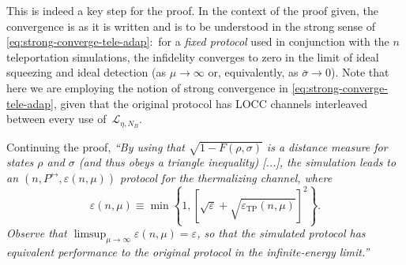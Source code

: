 \documentclass[apsrev,twocolumn]{revtex4-1}%
\begin{document}
This is indeed a key step for the proof. In the context of the proof given,
the convergence is as it is written and is to be understood in the strong
sense of \eqref{eq:strong-converge-tele-adap}:\ for a \textit{fixed protocol}
used in conjunction with the $n$ teleportation simulations, the infidelity
converges to zero in the limit of ideal squeezing and ideal detection (as
$\mu\rightarrow\infty$ or, equivalently, as $\bar{\sigma}\rightarrow0$). Note
that here we are employing the notion of strong convergence in
\eqref{eq:strong-converge-tele-adap}, given that the original protocol has
LOCC channels interleaved between every use of~$\mathcal{L}_{\eta,N_{B}}$.



Continuing the proof, \textit{\textquotedblleft By using that $\sqrt
{1-F(\rho,\sigma)}$ is a distance measure for states $\rho$ and $\sigma$ (and
thus obeys a triangle inequality) [...], the simulation leads to an
$(n,P^{\leftrightarrow},\varepsilon(n,\mu))$ protocol for the thermalizing
channel, where%
\begin{equation}
\varepsilon(n,\mu)\equiv\min\!\left\{  1,\left[  \sqrt{\varepsilon}%
+\sqrt{\varepsilon_{\operatorname{TP}}(n,\mu)}\right]  ^{2}\right\}  .
\end{equation}
Observe that $\limsup_{\mu\rightarrow\infty}\varepsilon(n,\mu)=\varepsilon$,
so that the simulated protocol has equivalent performance to the original
protocol in the infinite-energy limit.\textquotedblright}
\end{document}

